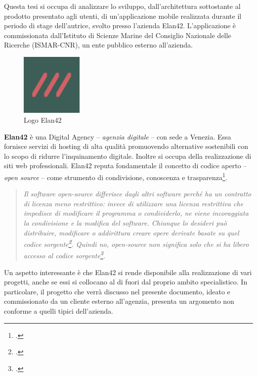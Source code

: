 \documentclass[./main.tex]{subfiles}
\begin{document}
Questa tesi si occupa di analizzare lo sviluppo, dall'architettura sottostante al prodotto presentato agli utenti, di un'applicazione mobile realizzata durante il periodo di stage dell'autrice, svolto presso l'azienda Elan42. L'applicazione è commissionata dall'Istituto di Scienze Marine del Consiglio Nazionale delle Ricerche (ISMAR-CNR), un ente pubblico esterno all'azienda.

\begin{figure}[!ht]
\vspace{1cm}
\centering
\includegraphics[width=3cm]{images/logo_elan42.pdf}
\caption{Logo Elan42}
\label{fig:elan42}
\end{figure}

\textbf{Elan42} è una Digital Agency -- \textit{agenzia digitale} -- con sede a Venezia. Essa fornisce servizi di hosting di alta qualità promuovendo alternative sostenibili con lo scopo di ridurre l'inquinamento digitale. Inoltre si occupa della realizzazione di siti web professionali. Elan42 reputa fondamentale il concetto di codice aperto -- \textit{open source} -- come strumento di condivisione, conoscenza e trasparenza\footcite[\url{https://www.elan42.com/}]{website-elan42}.\par

\begin{quote}
\textit{Il software open-source differisce dagli altri software perché ha un contratto di licenza meno restrittivo: invece di utilizzare una licenza restrittiva che impedisce di modificare il programma o condividerlo, ne viene incoraggiata la condivisione e la modifica del software.  Chiunque lo desideri può distribuire, modificare o addirittura creare opere derivate basate su quel codice sorgente\footcite[\url{https://web.archive.org/web/20081028104313/http://www.diffingo.com/oss/whyoss}]{website-whatis-opensource}. Quindi no, open-source non significa solo che si ha libero accesso al codice sorgente\footcite[\url{https://web.archive.org/web/20070611152544/https://opensource.org/docs/osd}]{website-opensource-def}}.
\end{quote} 

Un aspetto interessante è che Elan42 si rende disponibile alla realizzazione di vari progetti, anche se essi si collocano al di fuori dal proprio ambito specialistico. In particolare, il progetto che verrà discusso nel presente documento, ideato e commissionato da un cliente esterno all'agenzia, presenta un argomento non conforme a quelli tipici dell'azienda.\par
\end{document}
